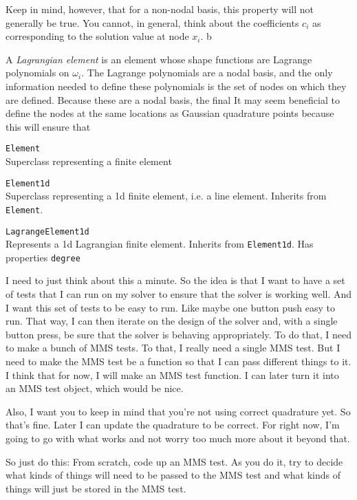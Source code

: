 \documentclass{amsart}
\begin{document}
Keep in mind, however, that for a non-nodal basis, this property will not generally be true. You cannot, in general, think about the coefficients $c_i$ as corresponding to the solution value at node $x_i$. b

A \textit{Lagrangian element} is an element whose shape functions are Lagrange polynomials on $\omega_i$. The Lagrange polynomials are a nodal basis, and the only information needed to define these polynomials is the set of nodes on which they are defined. Because these are a nodal basis, the final It may seem beneficial to define the nodes at the same locations as Gaussian quadrature points because this will ensure that  




\texttt{Element} \\
Superclass representing a finite element

\texttt{Element1d} \\
Superclass representing a 1d finite element, i.e. a line element. Inherits from \texttt{Element}.

\texttt{LagrangeElement1d} \\
Represents a 1d Lagrangian finite element. Inherits from \texttt{Element1d}. Has properties \texttt{degree}




I need to just think about this a minute. So the idea is that I want to have a set of tests that I can run on my solver to ensure that the solver is working well. And I want this set of tests to be easy to run. Like maybe one button push easy to run. That way, I can then iterate on the design of the solver and, with a single button press, be sure that the solver is behaving appropriately. To do that, I need to make a bunch of MMS tests. To that, I really need a single MMS test. But I need to make the MMS test be a function so that I can pass different things to it. I think that for now, I will make an MMS test function. I can later turn it into an MMS test object, which would be nice. 

Also, I want you to keep in mind that you're not using correct quadrature yet. So that's fine. Later I can update the quadrature to be correct. For right now, I'm going to go with what works and not worry too much more about it beyond that. 

So just do this: From scratch, code up an MMS test. As you do it, try to decide what kinds of things will need to be passed to the MMS test and what kinds of things will just be stored in the MMS test. 
\end{document}
